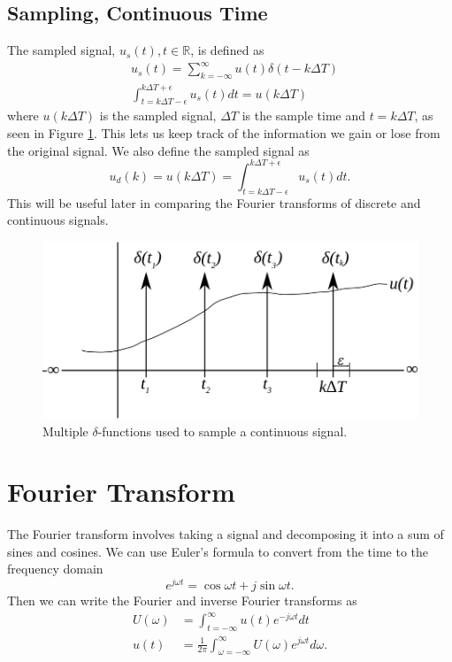 \documentclass[lecture,12pt,]{pcms-l}
\theoremstyle{example}
\newcommand{\tint}{\int_{t=-\infty}^\infty}
\newcommand{\fint}{\int_{\omega=-\infty}^\infty}
\newcommand{\w}{\omega}
\begin{document}
\subsection{Sampling, Continuous Time}
The sampled signal, $u_s(t), t \in \mathbb{R}$, is defined as
\begin{align*}
&u_s(t) = \sum_{k=-\infty}^\infty u(t)\delta(t-k\Delta T) \\
&\int_{t=k\Delta T-\epsilon}^{k\Delta T+\epsilon} u_s(t)dt = u(k\Delta T)
\end{align*}
where $u(k\Delta T)$ is the sampled signal, $\Delta T$ is the sample time and $t=k\Delta T$, as seen in Figure \ref{fig:02samplingDeltaFn}. This lets us keep track of the information we gain or lose from the original signal. We also define the sampled signal as
$$u_d(k) = u(k\Delta T) = \int_{t=k\Delta T-\epsilon}^{k\Delta T+\epsilon} u_s(t)dt.$$
This will be useful later in comparing the Fourier transforms of discrete and continuous signals.
\begin{figure}[ht!]
	\centering
	\includegraphics[width=.4\textwidth]{images/02samplingDeltaFn}
	\caption{Multiple $\delta$-functions used to sample a continuous signal.}
	\label{fig:02samplingDeltaFn}
\end{figure}

\section{Fourier Transform}
The Fourier transform involves taking a signal and decomposing it into a sum of sines and cosines. We can use Euler's formula to convert from the time to the frequency domain
$$e^{j\w t} = \cos\w t + j\sin\w t.$$
Then we can write the Fourier and inverse Fourier transforms as
\begin{align*}
U(\w) &= \tint u(t)e^{-j\w t}dt \\
u(t) &= \frac{1}{2\pi} \fint U(\w)e^{j\w t}d\w.
\end{align*}
\end{document}
